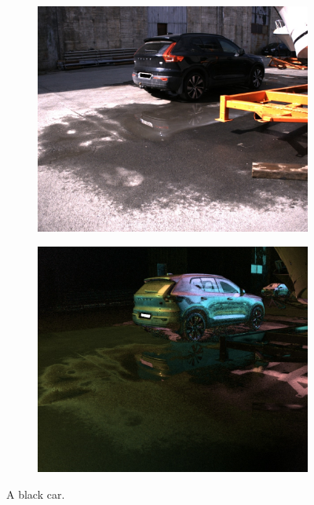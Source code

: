 \begin{figure}[H]
    \begin{subfigure}[T]{.49\textwidth}
        \includegraphics[width=\textwidth]{figures/pictures/img_1116_s0.jpg}
    \end{subfigure} \hfill
    \begin{subfigure}[T]{.49\textwidth}
        \includegraphics[width=\textwidth]{figures/pictures/img_1116_pol.jpg}
    \end{subfigure}
    \caption{A black car.}
\end{figure}
\vspace{-.5cm}


